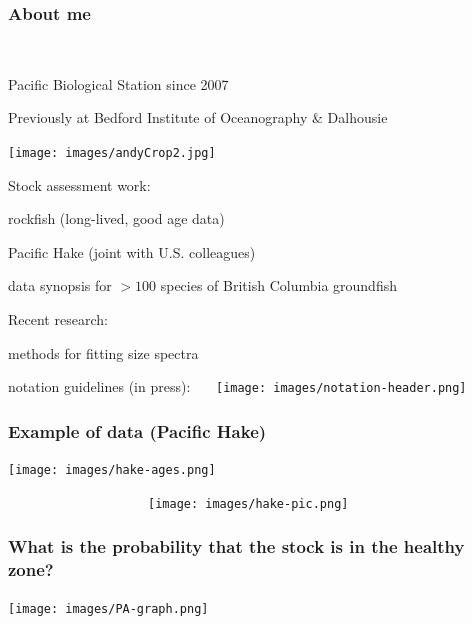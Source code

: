 
\begin{frame}
\frametitle{About me}
~\\

\begin{minipage}{12cm}
\bi
  \item Pacific Biological Station since 2007
  \item Previously at Bedford Institute of Oceanography \& Dalhousie
\ei
\end{minipage}
\begin{minipage}{2cm}
  \texttt{[image: images/andyCrop2.jpg]}
\end{minipage}

\bi
  \item Stock assessment work:
    \bi
    \item rockfish (long-lived, good age data)
    \item Pacific Hake (joint with U.S. colleagues)
    \item data synopsis for $>100$ species of British Columbia groundfish
  \ei
  \item Recent research:
  \bi
    \item methods for fitting size spectra
    \item notation guidelines (in press):
  \ei
\ei
\medskip
\pause
~~~\texttt{[image: images/notation-header.png]}
\end{frame}


\begin{frame}
\frametitle{Example of data (Pacific Hake)}


\begin{minipage}{8cm}
\texttt{[image: images/hake-ages.png]}
\end{minipage}
\begin{minipage}{5cm}
~~~~~~~~~~~~~~~~~~~~\texttt{[image: images/hake-pic.png]}
\end{minipage}

\end{frame}


\begin{frame}
\frametitle{What is the probability that the stock is in the healthy zone?}

\centering
\texttt{[image: images/PA-graph.png]}

\end{frame}

